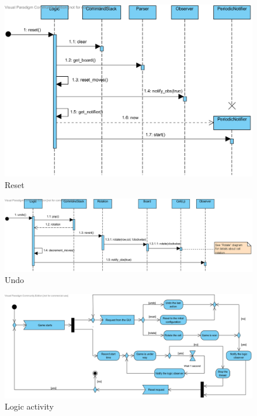 \documentclass[a4paper,11pt]{article}
\begin{document}
\begin{figure}[h]
	\center
	\includegraphics[angle=90,scale=1]{reset.png}
	\caption{Reset}
	\label{fig:reset}
\end{figure}
\begin{figure}[h]
	\center
	\includegraphics[angle=90,scale=1]{undo.png}
	\caption{Undo}
	\label{fig:undo}
\end{figure}
\begin{figure}[h]
	\center
	\includegraphics[angle=90,scale=1]{logic_activity.png}
	\caption{Logic activity}
	\label{fig:log_acti}
\end{figure}
\end{document}
